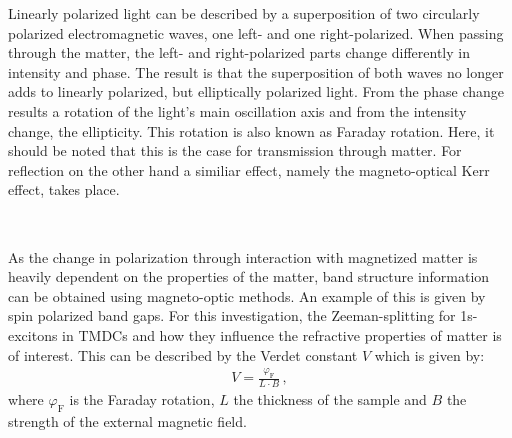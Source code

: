   Linearly polarized light can be described by a superposition of two circularly polarized electromagnetic waves, one left- and one right-polarized.
	When passing through the matter, the left- and right-polarized parts change differently in intensity and phase.
	The result is that the superposition of both waves no longer adds to linearly polarized, but elliptically polarized light.
	From the phase change results a rotation of the light's main oscillation axis and from the intensity change, the ellipticity.
	This rotation is also known as Faraday rotation.
	Here, it should be noted that this is the case for transmission through matter.
  For reflection on the other hand a similiar effect, namely the magneto-optical Kerr effect, takes place.

	\

	As the change in polarization through interaction with magnetized matter is heavily dependent on the properties of the matter, band structure information can be obtained using magneto-optic methods.
	An example of this is given by spin polarized band gaps.
	For this investigation, the Zeeman-splitting for 1s-excitons in TMDCs and how they influence the refractive properties of matter is of interest.
	This can be described by the Verdet constant $V$ which is given by:
	\begin{align*}
		V = \frac{\varphi_\text{F}}{L\cdot B} \,,
	\end{align*}
	where $\varphi_\text{F}$ is the Faraday rotation, $L$ the thickness of the sample and $B$ the strength of the external magnetic field.

